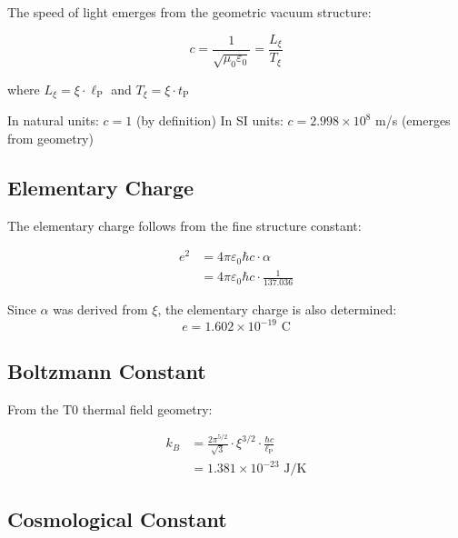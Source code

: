 \documentclass[12pt,a4paper]{article}
\newcommand{\lP}{\ell_{\text{P}}}
\newcommand{\tP}{t_{\text{P}}}
\newcommand{\xipar}{\xi}  %
\begin{document}
	The speed of light emerges from the geometric vacuum structure:
	
	\begin{keyresult}
		\begin{equation}
			c = \frac{1}{\sqrt{\mu_0 \varepsilon_0}} = \frac{L_{\xipar}}{T_{\xipar}}
		\end{equation}
		
		where $L_{\xipar} = \xipar \cdot \lP$ and $T_{\xipar} = \xipar \cdot \tP$
		
		In natural units: $c = 1$ (by definition)
		In SI units: $c = 2.998 \times 10^8$ m/s (emerges from geometry)
	\end{keyresult}
	
	\subsection{Elementary Charge}
	
	The elementary charge follows from the fine structure constant:
	
	\begin{keyresult}
		\begin{align}
			e^2 &= 4\pi\varepsilon_0\hbar c \cdot \alpha \\
			&= 4\pi\varepsilon_0\hbar c \cdot \frac{1}{137.036}
		\end{align}
		
		Since $\alpha$ was derived from $\xipar$, the elementary charge is also determined:
		\begin{equation}
			e = 1.602 \times 10^{-19} \text{ C}
		\end{equation}
	\end{keyresult}
	
	\subsection{Boltzmann Constant}
	
	From the T0 thermal field geometry:
	
	\begin{keyresult}
		\begin{align}
			k_B &= \frac{2\pi^{5/2}}{\sqrt{3}} \cdot \xipar^{3/2} \cdot \frac{\hbar c}{\lP} \\
			&= 1.381 \times 10^{-23} \text{ J/K}
		\end{align}
	\end{keyresult}
	
	\subsection{Cosmological Constant}
	
\end{document}
